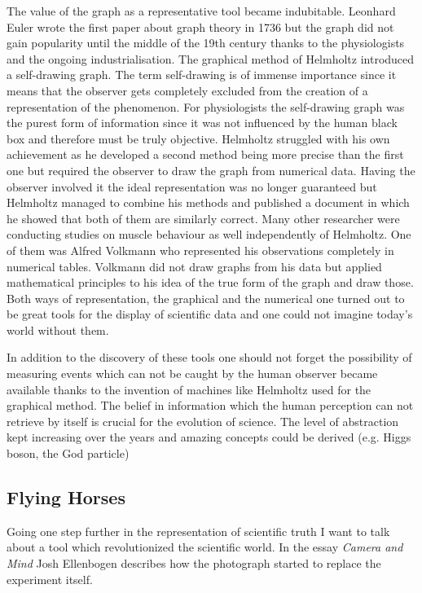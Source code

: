 \documentclass[12pt,a4paper]{article}
\begin{document}
The value of the graph as a representative tool became indubitable. Leonhard Euler wrote the first
paper about graph theory in 1736 \cite{graphtheory} but the graph did not gain popularity until the middle of
the 19th century thanks to the physiologists and the ongoing industrialisation.
The graphical method of Helmholtz introduced a self-drawing graph. The term self-drawing is 
of immense importance since it means that the observer gets completely excluded from the creation
of a representation of the phenomenon. For physiologists the self-drawing graph was the purest form
of information since it was not influenced by the human black box and therefore must be truly objective.
Helmholtz struggled with his own achievement as he developed a second method being more precise than
the first one but required the observer to draw the graph from numerical data.
Having the observer involved it the ideal representation was no longer guaranteed but Helmholtz managed
to combine his methods and published a document in which he showed that both of them are
similarly correct. Many other researcher were conducting studies on muscle behaviour as well independently
of Helmholtz. One of them was Alfred Volkmann who represented his observations completely in numerical
tables. Volkmann did not draw graphs from his data but applied mathematical principles to
his idea of the true form of the graph and draw those. Both ways of representation, the graphical and
the numerical one turned out to be great tools for the display of scientific data and one could not
imagine today's world without them.

In addition to the discovery of these tools one should not forget the possibility of measuring
events which can not be caught by the human observer became available thanks to the invention of
machines like Helmholtz used for the graphical method. The belief in information which the
human perception can not retrieve by itself is crucial for the evolution of science.
The level of abstraction kept increasing over the years and amazing concepts could be derived
(e.g. Higgs boson, the God particle)

\subsection*{Flying Horses}

Going one step further in the representation of scientific truth I want to talk about a
tool which revolutionized the scientific world. In the essay {\it{Camera and Mind}} \cite{ellenbogen} Josh
Ellenbogen describes how the photograph started to replace the experiment itself.
\end{document}

